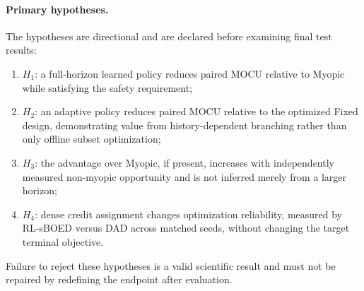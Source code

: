 \documentclass[11pt]{article}
\begin{document}
\paragraph{Primary hypotheses.}
The hypotheses are directional and are declared before examining final test
results:
\begin{enumerate}
    \item \(H_1\): a full-horizon learned policy reduces paired MOCU relative
    to Myopic while satisfying the safety requirement;
    \item \(H_2\): an adaptive policy reduces paired MOCU relative to the
    optimized Fixed design, demonstrating value from history-dependent
    branching rather than only offline subset optimization;
    \item \(H_3\): the advantage over Myopic, if present, increases with
    independently measured non-myopic opportunity and is not inferred merely
    from a larger horizon;
    \item \(H_4\): dense credit assignment changes optimization reliability,
    measured by RL-sBOED versus DAD across matched seeds, without changing the
    target terminal objective.
\end{enumerate}
Failure to reject these hypotheses is a valid scientific result and must not
be repaired by redefining the endpoint after evaluation.
\end{document}
